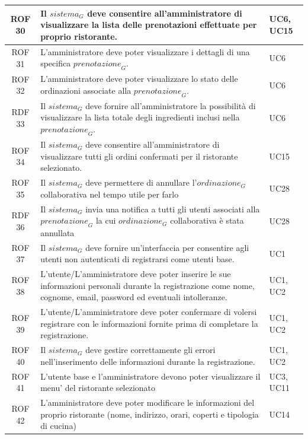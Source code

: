 \documentclass[12pt, oneside]{article}
\begin{document}
\begin{longtable}{|c|p{14cm}|p{2cm}|}
    ROF 30& Il $\textit{sistema}_G$ deve consentire all'amministratore di visualizzare la lista delle prenotazioni effettuate per proprio ristorante. & UC6, UC15 \\
    \hline
    ROF 31& L'amministratore deve poter visualizzare i dettagli di una specifica $\textit{prenotazione}_G$. & UC6 \\
    \hline
    ROF 32& L'amministratore deve poter visualizzare lo stato delle ordinazioni associate alla $\textit{prenotazione}_G$. & UC6 \\
    \hline
    RDF 33& Il $\textit{sistema}_G$ deve fornire all'amministratore la possibilità di visualizzare la lista totale degli ingredienti inclusi nella $\textit{prenotazione}_G$. & UC6 \\
    \hline
    ROF 34& Il $\textit{sistema}_G$ deve consentire all'amministratore di visualizzare tutti gli ordini confermati per il ristorante selezionato. & UC15 \\
    \hline
    ROF 35& Il $\textit{sistema}_G$ deve permettere di annullare l'$\textit{ordinazione}_G$ collaborativa nel tempo utile per farlo & UC28 \\
    \hline
    RDF 36& Il $\textit{sistema}_G$ invia una notifica a tutti gli utenti associati alla $\textit{prenotazione}_G$ la cui $\textit{ordinazione}_G$ collaborativa è stata annullata & UC28 \\
    \hline
    ROF 37& Il $\textit{sistema}_G$ deve fornire un'interfaccia per consentire agli utenti non autenticati di registrarsi come utenti base. & UC1 \\
    \hline
    ROF 38& L'utente/L'amministratore deve poter inserire le sue informazioni personali durante la registrazione come nome, cognome, email, password ed eventuali intolleranze. & UC1, UC2 \\
    \hline
    ROF 39& L'utente/L'amministratore deve poter confermare di volersi registrare con le informazioni fornite prima di completare la registrazione. & UC1, UC2 \\
    \hline
    ROF 40& Il $\textit{sistema}_G$ deve gestire correttamente gli errori nell'inserimento delle informazioni durante la registrazione. & UC1, UC2 \\
    \hline 
    ROF 41& L'utente base e l'amministratore devono poter visualizzare il menu' del ristorante selezionato & UC3, UC11\\
    \hline
    ROF 42& L'amministratore deve poter modificare le informazioni del proprio ristorante (nome, indirizzo, orari, coperti e tipologia di cucina) & UC14\\

\end{longtable}
\end{document}
